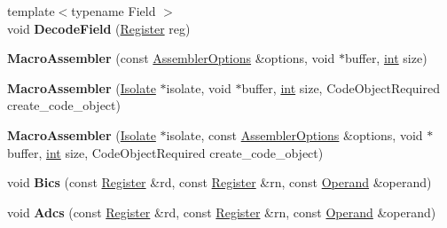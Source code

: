 \begin{DoxyCompactItemize}
\item 
\mbox{\label{classv8_1_1internal_1_1MacroAssembler_a132efbdb5d6abe37ed26edc851c715f0}} 
{\footnotesize template$<$typename Field $>$ }\\void {\bfseries Decode\+Field} (\mbox{\hyperlink{classv8_1_1internal_1_1Register}{Register}} reg)
\item 
\mbox{\label{classv8_1_1internal_1_1MacroAssembler_ab454c229ecab5061af905b7d5959c919}} 
{\bfseries Macro\+Assembler} (const \mbox{\hyperlink{structv8_1_1internal_1_1AssemblerOptions}{Assembler\+Options}} \&options, void $\ast$buffer, \mbox{\hyperlink{classint}{int}} size)
\item 
\mbox{\label{classv8_1_1internal_1_1MacroAssembler_ace8e2b09ca4bac1b40d12d84416284f9}} 
{\bfseries Macro\+Assembler} (\mbox{\hyperlink{classv8_1_1internal_1_1Isolate}{Isolate}} $\ast$isolate, void $\ast$buffer, \mbox{\hyperlink{classint}{int}} size, Code\+Object\+Required create\+\_\+code\+\_\+object)
\item 
\mbox{\label{classv8_1_1internal_1_1MacroAssembler_a118ab3d38490e9a50ee0157274ac3dc9}} 
{\bfseries Macro\+Assembler} (\mbox{\hyperlink{classv8_1_1internal_1_1Isolate}{Isolate}} $\ast$isolate, const \mbox{\hyperlink{structv8_1_1internal_1_1AssemblerOptions}{Assembler\+Options}} \&options, void $\ast$buffer, \mbox{\hyperlink{classint}{int}} size, Code\+Object\+Required create\+\_\+code\+\_\+object)
\item 
\mbox{\label{classv8_1_1internal_1_1MacroAssembler_a2106c106bbb7e13bc035fe5f3c619009}} 
void {\bfseries Bics} (const \mbox{\hyperlink{classv8_1_1internal_1_1Register}{Register}} \&rd, const \mbox{\hyperlink{classv8_1_1internal_1_1Register}{Register}} \&rn, const \mbox{\hyperlink{classv8_1_1internal_1_1Operand}{Operand}} \&operand)
\item 
\mbox{\label{classv8_1_1internal_1_1MacroAssembler_a1dc498a44b6fa3355e79fe61d8f0dd76}} 
void {\bfseries Adcs} (const \mbox{\hyperlink{classv8_1_1internal_1_1Register}{Register}} \&rd, const \mbox{\hyperlink{classv8_1_1internal_1_1Register}{Register}} \&rn, const \mbox{\hyperlink{classv8_1_1internal_1_1Operand}{Operand}} \&operand)

\end{DoxyCompactItemize}
